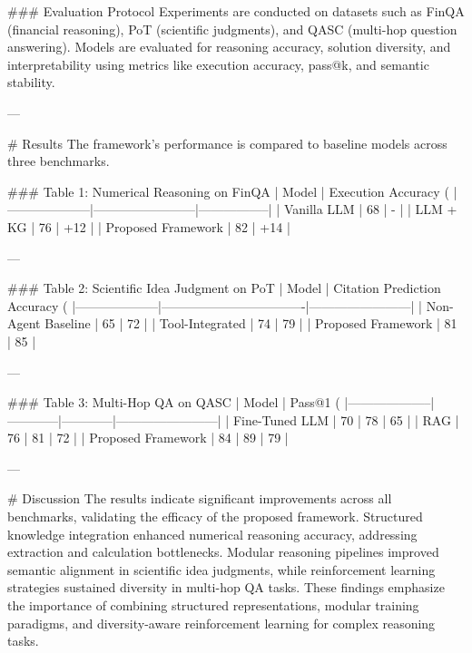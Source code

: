 ### Evaluation Protocol  
Experiments are conducted on datasets such as FinQA (financial reasoning), PoT (scientific judgments), and QASC (multi-hop question answering). Models are evaluated for reasoning accuracy, solution diversity, and interpretability using metrics like execution accuracy, pass@k, and semantic stability.  

---

# Results  
The framework's performance is compared to baseline models across three benchmarks.  

### Table 1: Numerical Reasoning on FinQA  
| Model              | Execution Accuracy (%
|--------------------|------------------------|-----------------|
| Vanilla LLM        | 68                     | -               |
| LLM + KG           | 76                     | +12             |
| Proposed Framework | 82                     | +14             |

---

### Table 2: Scientific Idea Judgment on PoT  
| Model              | Citation Prediction Accuracy (%
|--------------------|----------------------------------|------------------------|
| Non-Agent Baseline | 65                               | 72                     |
| Tool-Integrated    | 74                               | 79                     |
| Proposed Framework | 81                               | 85                     |

---

### Table 3: Multi-Hop QA on QASC  
| Model              | Pass@1 (%
|--------------------|------------|------------|------------------------|
| Fine-Tuned LLM     | 70         | 78         | 65                     |
| RAG                | 76         | 81         | 72                     |
| Proposed Framework | 84         | 89         | 79                     |

---

# Discussion  
The results indicate significant improvements across all benchmarks, validating the efficacy of the proposed framework. Structured knowledge integration enhanced numerical reasoning accuracy, addressing extraction and calculation bottlenecks. Modular reasoning pipelines improved semantic alignment in scientific idea judgments, while reinforcement learning strategies sustained diversity in multi-hop QA tasks. These findings emphasize the importance of combining structured representations, modular training paradigms, and diversity-aware reinforcement learning for complex reasoning tasks.  

